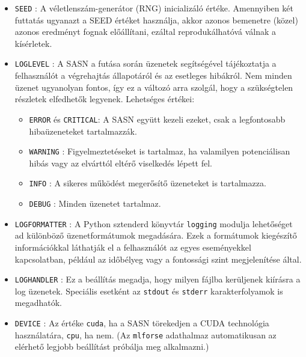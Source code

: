 \documentclass[twoside, 12pt]{report}
\begin{document}
\begin{itemize}[noitemsep]
  \item \verb|SEED| : A véletlenszám-generátor (RNG) inicializáló értéke. Amennyiben két futtatás ugyanazt a SEED értéket használja, akkor azonos bemenetre (közel) azonos eredményt fognak előállítani, ezáltal reprodukálhatóvá válnak a kísérletek.\footnotemark{}


  \item \verb|LOGLEVEL| : A SASN a futása során üzenetek segítségével tájékoztatja a felhasználót a végrehajtás állapotáról és az esetleges hibákról. Nem minden üzenet ugyanolyan fontos, így ez a változó arra szolgál, hogy a szükségtelen részletek elfedhetők legyenek. Lehetséges értékei:
    \begin{itemize}[noitemsep]
        \item \verb|ERROR| és \verb|CRITICAL|: A SASN együtt kezeli ezeket, csak a legfontosabb hibaüzeneteket tartalmazzák.
      \item \verb|WARNING| : Figyelmeztetéseket is tartalmaz, ha valamilyen potenciálisan hibás vagy az elvárttól eltérő viselkedés lépett fel.
      \item \verb|INFO| : A sikeres működést megerősítő üzeneteket is tartalmazza.
      \item \verb|DEBUG| : Minden üzenetet tartalmaz.
    \end{itemize}
  \item \verb|LOGFORMATTER| : A Python sztenderd könyvtár \verb|logging| modulja \parencite{Saja} lehetőséget ad különböző üzenetformátumok megadására. Ezek a formátumok kiegészítő információkkal láthatják el a felhasználót az egyes eseményekkel kapcsolatban, például az időbélyeg vagy a fontossági szint megjelenítése által.
  \item \verb|LOGHANDLER| : Ez a beállítás megadja, hogy milyen fájlba kerüljenek kiírásra a log üzenetek. Speciális esetként az \verb|stdout| és \verb|stderr| karakterfolyamok is megadhatók.
  \item \verb|DEVICE| : Az értéke \verb|cuda|, ha a SASN törekedjen a CUDA technológia használatára, \verb|cpu|, ha nem. (Az \verb|mlforse| adathalmaz automatikusan az elérhető legjobb beállítást próbálja meg alkalmazni.)

\end{itemize}
\end{document}
